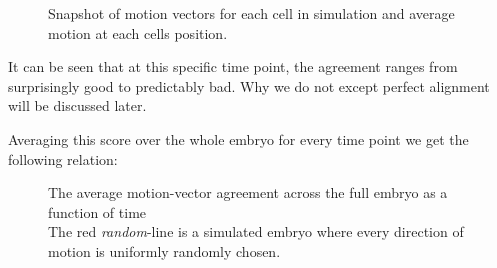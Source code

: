 \begin{figure}[H]
    \centering
    \caption{Snapshot of motion vectors for each cell in simulation and average motion at each cells position. }
    \label{fig:motionAgreementExample}
\end{figure}

It can be seen that at this specific time point, the agreement ranges from surprisingly good to predictably bad. Why we do not except perfect alignment will be discussed later.

Averaging this score over the whole embryo for every time point we get the following relation:

\begin{figure}[H]
    \centering
    \caption{The average motion-vector agreement across the full embryo as a function of time\\
    The red \textit{random}-line is a simulated embryo where every direction of motion is uniformly randomly chosen. }
    \label{fig:motionAgreement}
\end{figure}


